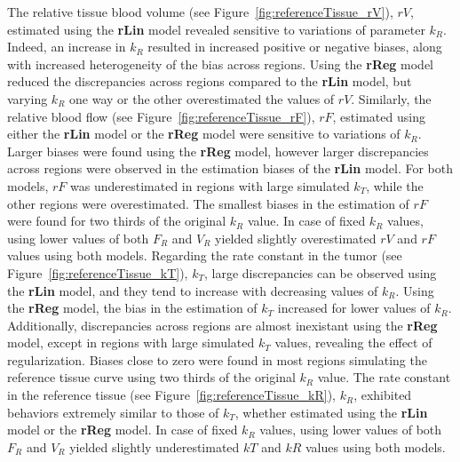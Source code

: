 The relative tissue blood volume (see Figure~\ref{fig:referenceTissue_rV}), $rV$, estimated using the \textbf{rLin} model revealed sensitive to variations of parameter $k_R$.
Indeed, an increase in $k_R$ resulted in increased positive or negative biases, along with increased heterogeneity of the bias across regions.
Using the \textbf{rReg} model reduced the discrepancies across regions compared to the \textbf{rLin} model, but varying $k_R$ one way or the other overestimated the values of $rV$.
Similarly, the relative blood flow (see Figure~\ref{fig:referenceTissue_rF}), $rF$, estimated using either the \textbf{rLin} model or the \textbf{rReg} model were sensitive to variations of $k_R$. 
Larger biases were found using the \textbf{rReg} model, however larger discrepancies across regions were observed in the estimation biases of the \textbf{rLin} model.
For both models, $rF$ was underestimated in regions with large simulated $k_T$, while the other regions were overestimated.
The smallest biases in the estimation of $rF$ were found for two thirds of the original $k_R$ value.
In case of fixed $k_R$ values, using lower values of both $F_R$ and $V_R$ yielded slightly overestimated $rV$ and $rF$ values using both models.
Regarding the rate constant in the tumor (see Figure~\ref{fig:referenceTissue_kT}), $k_T$, large discrepancies can be observed using the \textbf{rLin} model, and they tend to increase with decreasing values of $k_R$.
Using the \textbf{rReg} model, the bias in the estimation of $k_T$ increased for lower values of $k_R$.
Additionally, discrepancies across regions are almost inexistant using the \textbf{rReg} model, except in regions with large simulated $k_T$ values, revealing the effect of regularization.
Biases close to zero were found in most regions simulating the reference tissue curve using two thirds of the original $k_R$ value.
The rate constant in the reference tissue (see Figure~\ref{fig:referenceTissue_kR}), $k_R$, exhibited behaviors extremely similar to those of $k_T$, whether estimated using the \textbf{rLin} model or the \textbf{rReg} model.
In case of fixed $k_R$ values, using lower values of both $F_R$ and $V_R$ yielded slightly underestimated $kT$ and $kR$ values using both models.

